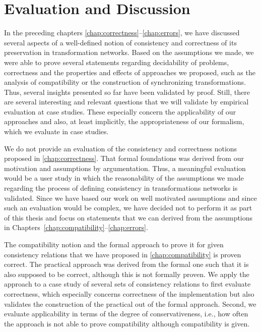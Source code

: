 \chapter{Evaluation and Discussion 
}
\label{chap:correctness_evaluation}


In the preceding chapters \ref{chap:correctness}--\ref{chap:errors}, we have discussed several aspects of a well-defined notion of consistency and correctness of its preservation in transformation networks.
Based on the assumptions we made, we were able to prove several statements regarding decidability of problems, correctness and the properties and effects of approaches we proposed, such as the analysis of compatibility or the construction of synchronizing transformations.
Thus, several insights presented so far have been validated by proof.
Still, there are several interesting and relevant questions that we will validate by empirical evaluation at case studies.
These especially concern the applicability of our approaches and also, at least implicitly, the appropriateness of our formalism, which we evaluate in case studies.

We do not provide an evaluation of the consistency and correctness notions proposed in \autoref{chap:correctness}.
That formal foundations was derived from our motivation and assumptions by argumentation.
Thus, a meaningful evaluation would be a user study in which the reasonability of the assumptions we made regarding the process of defining consistency in transformations networks is validated.
Since we have based our work on well motivated assumptions and since such an evaluation would be complex, we have decided not to perform it as part of this thesis and focus on statements that we can derived from the assumptions in Chapters~\ref{chap:compatibility}--\ref{chap:errors}.

The compatibility notion and the formal approach to prove it for given consistency relations that we have proposed in \autoref{chap:compatibility} is proven correct.
The practical approach was derived from the formal one such that it is also supposed to be correct, although this is not formally proven.
We apply the approach to a case study of several sets of consistency relations to first evaluate correctness, which especially concerns correctness of the implementation but also validates the construction of the practical out of the formal approach.
Second, we evaluate applicability in terms of the degree of conservativeness, i.e., how often the approach is not able to prove compatibility although compatibility is given.

